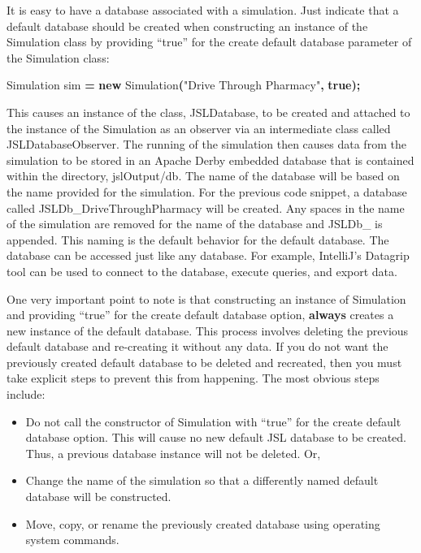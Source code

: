 \documentclass[
]{book}
\newenvironment{Shaded}{\begin{snugshade}}{\end{snugshade}}
\newcommand{\FunctionTok}[1]{\textcolor[rgb]{0.00,0.00,0.00}{#1}}
\newcommand{\KeywordTok}[1]{\textcolor[rgb]{0.13,0.29,0.53}{\textbf{#1}}}
\newcommand{\NormalTok}[1]{#1}
\newcommand{\OperatorTok}[1]{\textcolor[rgb]{0.81,0.36,0.00}{\textbf{#1}}}
\newcommand{\StringTok}[1]{\textcolor[rgb]{0.31,0.60,0.02}{#1}}
\providecommand{\tightlist}{%
  \setlength{\itemsep}{0pt}\setlength{\parskip}{0pt}}
\theoremstyle{definition}
\theoremstyle{definition}
\theoremstyle{definition}
\theoremstyle{definition}
\theoremstyle{remark}
\begin{document}
It is easy to have a database associated with a simulation. Just
indicate that a default database should be created when constructing an
instance of the Simulation class by providing ``true'' for the create
default database parameter of the Simulation class:

\begin{Shaded}
\begin{Highlighting}[]
\NormalTok{Simulation sim }\OperatorTok{=} \KeywordTok{new} \FunctionTok{Simulation}\OperatorTok{(}\StringTok{"Drive Through Pharmacy"}\OperatorTok{,} \KeywordTok{true}\OperatorTok{);}
\end{Highlighting}
\end{Shaded}

This causes an instance of the class, JSLDatabase, to be created and
attached to the instance of the Simulation as an observer via an
intermediate class called JSLDatabaseObserver. The running of the
simulation then causes data from the simulation to be stored in an
Apache Derby embedded database that is contained within the directory,
jslOutput/db. The name of the database will be based on the name
provided for the simulation. For the previous code snippet, a database
called JSLDb\_DriveThroughPharmacy will be created. Any spaces in the
name of the simulation are removed for the name of the database and
JSLDb\_ is appended. This naming is the default behavior for the default
database. The database can be accessed just like any database. For
example, IntelliJ's Datagrip tool can be used to connect to the
database, execute queries, and export data.

One very important point to note is that constructing an instance of
Simulation and providing ``true'' for the create default database option,
\textbf{always} creates a new instance of the default database. This process
involves deleting the previous default database and re-creating it
without any data. If you do not want the previously created default
database to be deleted and recreated, then you must take explicit steps
to prevent this from happening. The most obvious steps include:

\begin{itemize}
\tightlist
\item
  Do not call the constructor of Simulation with ``true'' for the create
  default database option. This will cause no new default JSL database
  to be created. Thus, a previous database instance will not be
  deleted. Or,
\item
  Change the name of the simulation so that a differently named
  default database will be constructed.
\item
  Move, copy, or rename the previously created database using
  operating system commands.
\end{itemize}
\end{document}
